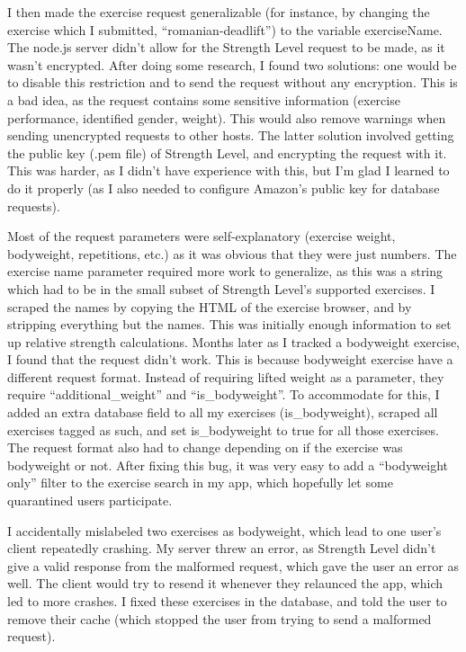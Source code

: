 \documentclass{l4proj}
\begin{document}
I then made the exercise request generalizable (for instance, by changing the exercise which I submitted, ``romanian-deadlift'') to the variable exerciseName. The node.js server didn't allow for the Strength Level request to be made, as it wasn't encrypted. After doing some research, I found two solutions: one would be to disable this restriction and to send the request without any encryption. This is a bad idea, as the request contains some sensitive information (exercise performance, identified gender, weight). This would also remove warnings when sending unencrypted requests to other hosts. The latter solution involved getting the public key (.pem file) of Strength Level, and encrypting the request with it. This was harder, as I didn't have experience with this, but I'm glad I learned to do it properly (as I also needed to configure Amazon's public key for database requests).

Most of the request parameters were self-explanatory (exercise weight, bodyweight, repetitions, etc.) as it was obvious that they were just numbers. The exercise name parameter required more work to generalize, as this was a string which had to be in the small subset of Strength Level's supported exercises. I scraped the names by copying the HTML of the exercise browser, and by stripping everything but the names. This was initially enough information to set up relative strength calculations. Months later as I tracked a bodyweight exercise, I found that the request didn't work. This is because bodyweight exercise have a different request format. Instead of requiring lifted weight as a parameter, they require ``additional\_weight'' and ``is\_bodyweight''. To accommodate for this, I added an extra database field to all my exercises (is\_bodyweight), scraped all exercises tagged as such, and set is\_bodyweight to true for all those exercises. The request format also had to change depending on if the exercise was bodyweight or not. After fixing this bug, it was very easy to add a ``bodyweight only'' filter to the exercise search in my app, which hopefully let some quarantined users participate. 

I accidentally mislabeled two exercises as bodyweight, which lead to one user's client repeatedly crashing. My server threw an error, as Strength Level didn't give a valid response from the malformed request, which gave the user an error as well. The client would try to resend it whenever they relaunced the app, which led to more crashes. I fixed these exercises in the database, and told the user to remove their cache (which stopped the user from trying to send a malformed request).
\end{document}

